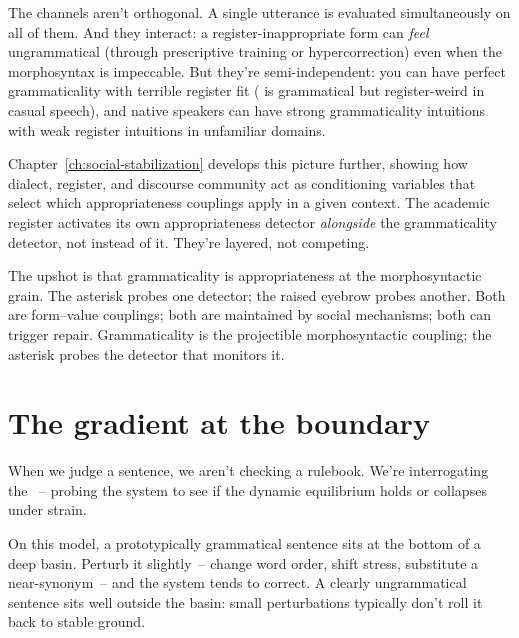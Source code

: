 The channels aren't orthogonal. A single utterance is evaluated simultaneously on all of them. And they interact: a register-inappropriate form can \emph{feel} ungrammatical (through prescriptive training or hypercorrection) even when the morphosyntax is impeccable. But they're semi-independent: you can have perfect grammaticality with terrible register fit ( is grammatical but register-weird in casual speech), and native speakers can have strong grammaticality intuitions with weak register intuitions in unfamiliar domains.

Chapter~\ref{ch:social-stabilization} develops this picture further, showing how dialect, register, and discourse community act as conditioning variables that select which appropriateness couplings apply in a given context. The academic register activates its own appropriateness detector \emph{alongside} the grammaticality detector, not instead of it. They're layered, not competing.

The upshot is that grammaticality is appropriateness at the morphosyntactic grain. The asterisk probes one detector; the raised eyebrow probes another. Both are form--value couplings; both are maintained by social mechanisms; both can trigger repair. Grammaticality is the projectible morphosyntactic coupling; the asterisk probes the detector that monitors it.


\section{The gradient at the boundary}
\label{sec:14:gradient}

When we judge a sentence, we aren't checking a rulebook. We're interrogating the ~-- probing the system to see if the dynamic equilibrium holds or collapses under strain.

On this model, a prototypically grammatical sentence sits at the bottom of a deep basin. Perturb it slightly~-- change word order, shift stress, substitute a near-synonym~-- and the system tends to correct. A clearly ungrammatical sentence sits well outside the basin: small perturbations typically don't roll it back to stable ground.

